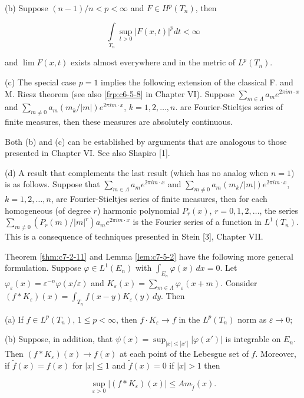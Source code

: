 (b) Suppose $(n - 1)/n < p < \infty$ and $F \in H^p(T_n)$, then

\[
\int\limits_{T_{n}}\sup_{t>0}|F(x,t)|^{p}dt<\infty
\]

and $\lim F(x, t)$ exists almost everywhere and in the metric of $L^{p}(T_{n})$.

(c) The special case $p = 1$ implies the following extension of the classical F. and M. Riesz theorem (see also \eqref{frp:c6-5-8} in Chapter VI). Suppose $\sum_{m \in \Lambda} a_m e^{2\pi i m \cdot x}$ and $\sum_{m \neq 0} a_m (m_k / |m|) e^{2\pi i m \cdot x}$, $k = 1, 2, \ldots, n$. are Fourier-Stieltjes series of finite measures, then these measures are absolutely continuous.

Both (b) and (c) can be established by arguments that are analogous to those presented in Chapter VI. See also Shapiro [1].

(d) A result that complements the last result (which has no analog when $n=1$) is as follows. Suppose that $\sum_{m\in\Lambda} a_m e^{2\pi i m\cdot x}$ and $\sum_{m\neq0} a_m(m_k/|m|) e^{2\pi i m\cdot x}$, $k=1,2,\ldots,n$, are Fourier-Stieltjes series of finite measures, then for each homogeneous (of degree $r$) harmonic polynomial $P_r(x)$, $r=0,1,2,\ldots$, the series $\sum_{m\neq0}(P_r(m)/|m|^r) a_m e^{2\pi i m\cdot x}$ is the Fourier series of a function in $L^1(T_n)$. This is a consequence of techniques presented in Stein [3], Chapter VII.

 Theorem \ref{thm:c7-2-11} and Lemma \ref{lem:c7-5-2} have the following more general formulation. Suppose $\varphi \in L^1(E_n)$ with $\int_{E_n} \varphi(x) \, dx = 0$. Let $\varphi_\varepsilon(x) = \varepsilon^{-n} \varphi(x/\varepsilon)$ and $K_\varepsilon(x) = \sum_{m \in \Lambda} \varphi_\varepsilon(x + m)$. Consider $(f * K_\varepsilon)(x) = \int_{T_n} f(x - y) K_\varepsilon(y) \, dy$. Then

(a) If $f \in L^p(T_n)$, $1 \leq p < \infty$, then $f \cdot K_\varepsilon \to f$ in the $L^p(T_n)$ norm as $\varepsilon \to 0$;

(b) Suppose, in addition, that $\psi(x) = \sup_{|x| \leq |x'|} |\varphi(x')|$ is integrable on $E_n$. Then $(f * K_\varepsilon)(x) \to f(x)$ at each point of the Lebesgue set of $f$. Moreover, if $\tilde{f}(x) = f(x)$ for $|x| \leq 1$ and $\tilde{f}(x) = 0$ if $|x| > 1$ then

\[
\sup_{\varepsilon>0}\left|(f* K_{\varepsilon})(x)\right|\leq A m_{\tilde{f}}(x).
\]

